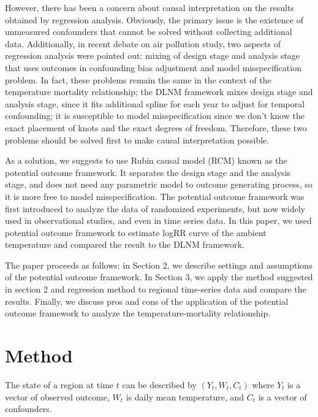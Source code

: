 \documentclass[12pt]{article}
\begin{document}
However, there has been a concern about causal interpretation 
on the results obtained by regression analysis.
Obviously, the primary issue is the existence of unmeasured confounders
that cannot be solved without collecting additional data.
Additionally, in recent debate on air pollution study\cite{dominici2019sci},
two aspects of regression analysis were pointed out:
mixing of design stage and analysis stage 
that uses outcomes in confounding bias adjustment\cite{rubin2007sim}
and model misspecification problem.
In fact, these problems remain the same in the context of the temperature mortality relationship;
the DLNM framework mixes design stage and analysis stage,
since it fits additional spline for each year to adjust for temporal confounding;
it is susceptible to model misspecification\cite{gasparrini2016}
since we don't know the exact placement of knots and the exact degrees of freedom.
Therefore, these two problems should be solved first to make causal interpretation possible.

As a solution, we suggests to use Rubin causal model (RCM)\cite{holland1986}
known as the potential outcome framework.
It separates the design stage and the analysis stage,
and does not need any parametric model to outcome generating process,
so it is more free to model misspecification.
The potential outcome framework was first introduced 
to analyze the data of randomized experiments\cite{rubin1974},
but now widely used in observational studies\cite{wu2020sciadv},
and even in time series data\cite{angrist2018}.
In this paper, we used potential outcome framework to estimate logRR curve of the ambient temperature 
and compared the result to the DLNM framework.

The paper proceeds as follows: 
in Section 2, we describe settings and assumptions of the potential outcome framework.
In Section 3, we apply the method suggested in section 2 and regression method 
to regional time-series data and compare the results.
Finally, we discuss pros and cons of 
the application of the potential outcome framework to analyze the temperature-mortality relationship.

\section{Method}

The state of a region at time $t$ can be described by $(Y_t, W_t, C_t)$ 
where $Y_t$ is a vector of observed outcome, $W_t$ is daily mean temperature, 
and $C_t$ is a vector of confounders.
\end{document}
